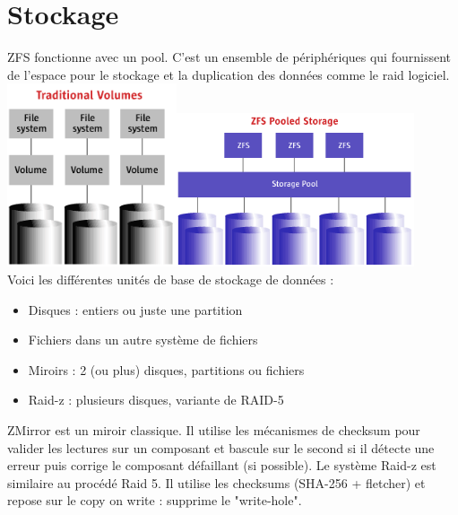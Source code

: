 \documentclass[a4paper]{report}
\begin{document}
	\section{Stockage}
	ZFS fonctionne avec un pool. C'est un ensemble de périphériques qui fournissent de l’espace pour le stockage et la duplication des données comme le raid logiciel. \\
	\includegraphics[width=5cm]{volumes_tradicionais.png}\includegraphics[width=7cm]{armazenamento_pooled_zfs.png}\\
	Voici les différentes unités de base de stockage de données :\\
	\begin{itemize}
		 \item Disques : entiers ou juste une partition
		 \item Fichiers dans un autre système de fichiers
		 \item Miroirs : 2 (ou plus) disques, partitions ou fichiers
		 \item Raid-z : plusieurs disques, variante de RAID-5\\
	\end{itemize}
	ZMirror est un miroir classique. Il utilise les mécanismes de checksum pour valider les lectures sur un composant et bascule sur le second si il détecte une erreur puis corrige le composant défaillant (si possible). Le système Raid-z est similaire au procédé Raid 5. Il utilise les checksums (SHA-256 + fletcher) et repose sur le copy on write : supprime le "write-hole".
\end{document}
